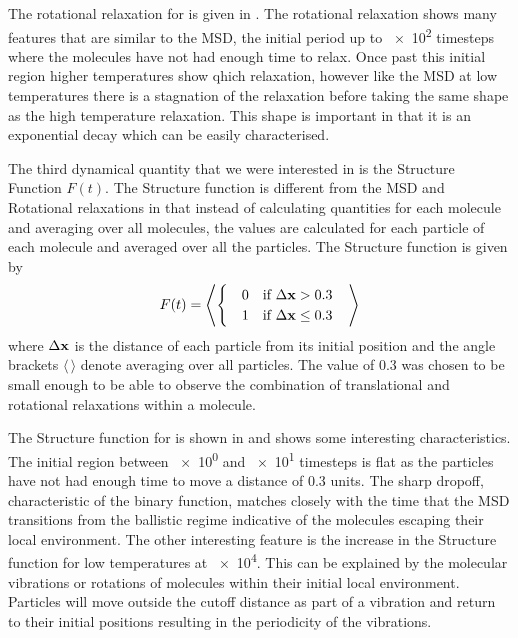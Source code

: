 The rotational relaxation for \sone is given in . The rotational relaxation shows many features that are similar to the MSD, the initial period up to \num{e2} timesteps where the molecules have not had enough time to relax. Once past this initial region higher temperatures show qhich relaxation, however like the MSD at low temperatures there is a stagnation of the relaxation before taking the same shape as the high temperature relaxation. This shape is important in that it is an exponential decay which can be easily characterised.

The third dynamical quantity that we were interested in is the Structure Function $F(t)$. The Structure function is different from the MSD and Rotational relaxations in that instead of calculating quantities for each molecule and averaging over all molecules, the values are calculated for each particle of each molecule and averaged over all the particles. The Structure function is given by
\begin{align}
    F(t) = \left \langle \begin{cases}
        \quad0 &\text{if } \Delta \mathbf{x} > 0.3 \\
        \quad1 &\text{if } \Delta \mathbf{x} \leq 0.3
    \end{cases} \quad \right \rangle
\end{align}
where $\Delta \mathbf{x}$ is the distance of each particle from its initial position and the angle brackets $\langle\,\rangle$ denote averaging over all particles. The value of \num{0.3} was chosen to be small enough to be able to observe the combination of translational and rotational relaxations within a molecule.

The Structure function for \sone is shown in  and shows some interesting characteristics. The initial region between \num{e0} and \num{e1} timesteps is flat as the particles have not had enough time to move a distance of \num{0.3} units. The sharp dropoff, characteristic of the binary function, matches closely with the time that the MSD transitions from the ballistic regime indicative of the molecules escaping their local environment. The other interesting feature is the increase in the Structure function for low temperatures at \num{e4}. This can be explained by the molecular vibrations or rotations of molecules within their initial local environment. Particles will move outside the cutoff distance as part of a vibration and return to their initial positions resulting in the periodicity of the vibrations.

